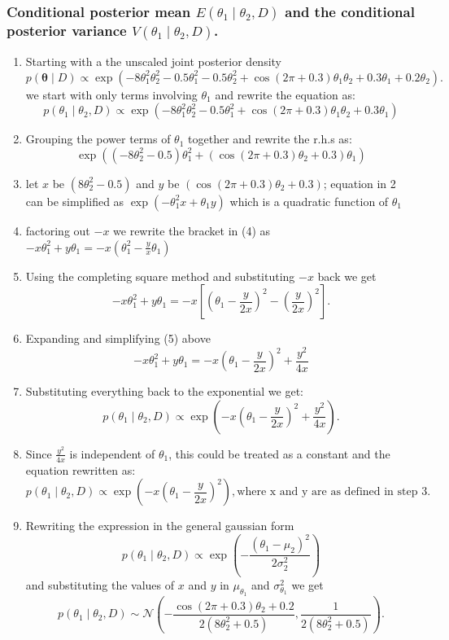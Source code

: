 \documentclass[12pt]{article}
\begin{document}
\subsubsection{Conditional posterior mean \(E(\theta_1 \mid \theta_2, D)\) and the conditional posterior variance \(V(\theta_1 \mid \theta_2, D)\).}
\begin{enumerate}
    \item Starting with a the unscaled joint posterior density \[
p(\boldsymbol{\theta} \mid D) \propto \exp\left(-8\theta_1^2\theta_2^2 - 0.5\theta_1^2 - 0.5\theta_2^2 + \cos(2\pi + 0.3)\theta_1\theta_2 + 0.3\theta_1 + 0.2\theta_2 \right).\] we start with only terms involving $\theta_1$ and rewrite the equation as: \[p(\theta_1 \mid \theta_2, D) \propto \exp\left(-8\theta_1^2\theta_2^2 - 0.5\theta_1^2 + \cos(2\pi + 0.3)\theta_1\theta_2+ 0.3\theta_1 \right) \]
    \item  Grouping the power terms of $\theta_1$ together and rewrite the r.h.s as:
    \[\exp\left((-8\theta_2^2 - 0.5)\theta_1^2 + (\cos(2\pi + 0.3)\theta_2+ 0.3)\theta_1 \right)\]
    \item let $x$ be $(8\theta_2^2 - 0.5)$ and $y$ be $(\cos(2\pi + 0.3)\theta_2+ 0.3)$; equation in 2  can be simplified as $\exp\left(-\theta_1^2x+ \theta_1y\right)$ which is a quadratic function of $\theta_1$
    \item factoring out $-x$ we rewrite the bracket in (4) as $-x\theta_1^2 + y\theta_1 = -x\left(\theta_1^2 - \frac{y}{x}\theta_1\right)$
    \item Using the completing square method and substituting $-x$ back we get
    \[
-x\theta_1^2 + y\theta_1 = -x\left[\left(\theta_1 - \frac{y}{2x}\right)^2 - \left(\frac{y}{2x}\right)^2\right].
\]
 \item Expanding and simplifying (5) above
 \[
-x\theta_1^2 + y\theta_1 = -x\left(\theta_1 - \frac{y}{2x}\right)^2 + \frac{y^2}{4x}
\]
\item Substituting everything back to the exponential we get:
\[
p(\theta_1 \mid \theta_2, D) \propto \exp\left(-x\left(\theta_1 - \frac{y}{2x}\right)^2 + \frac{y^2}{4x}\right).
\]
\item Since \(\frac{y^2}{4x}\) is independent of \(\theta_1\), this could be treated as a constant and the equation rewritten as:
\[
p(\theta_1 \mid \theta_2, D) \propto \exp\left(-x\left(\theta_1 - \frac{y}{2x}\right)^2\right), \text {where x and y are as defined in step 3}.\] 
\item Rewriting the expression in the general gaussian form \[p(\theta_1 \mid \theta_2, D) \propto \exp\left(-\frac{\left(\theta_1 - \mu_2\right)^2}{2\sigma_2^2}\right)\] and substituting the values of $x$ and $y$ in  $\mu_{\theta_1}$ and    $\sigma_{\theta_1}^2$ we get
\[
p \left(\theta_1 \mid \theta_2, D \right)\sim \mathcal{N}\left(-\frac{\cos(2\pi + 0.3)\theta_2 + 0.2}{2(8\theta_2^2 + 0.5)}, \frac{1}{2(8\theta_2^2 + 0.5)}\right).
\]
\end{enumerate} 
\end{document}
